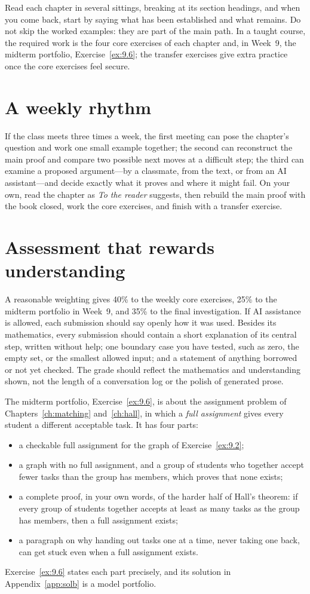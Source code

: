 Read each chapter in several sittings, breaking at its section headings, and when you come back, start by saying what has been established and what remains. Do not skip the worked examples: they are part of the main path. In a taught course, the required work is the four core exercises of each chapter and, in Week~9, the midterm portfolio, Exercise~\ref{ex:9.6}; the transfer exercises give extra practice once the core exercises feel secure.

\section*{A weekly rhythm}
If the class meets three times a week, the first meeting can pose the chapter's question and work one small example together; the second can reconstruct the main proof and compare two possible next moves at a difficult step; the third can examine a proposed argument---by a classmate, from the text, or from an AI assistant---and decide exactly what it proves and where it might fail. On your own, read the chapter as \emph{To the reader} suggests, then rebuild the main proof with the book closed, work the core exercises, and finish with a transfer exercise.

\section*{Assessment that rewards understanding}
A reasonable weighting gives 40\% to the weekly core exercises, 25\% to the midterm portfolio in Week~9, and 35\% to the final investigation. If AI assistance is allowed, each submission should say openly how it was used. Besides its mathematics, every submission should contain a short explanation of its central step, written without help; one boundary case you have tested, such as zero, the empty set, or the smallest allowed input; and a statement of anything borrowed or not yet checked. The grade should reflect the mathematics and understanding shown, not the length of a conversation log or the polish of generated prose.

The midterm portfolio, Exercise~\ref{ex:9.6}, is about the assignment problem of Chapters~\ref{ch:matching} and~\ref{ch:hall}, in which a \emph{full assignment} gives every student a different acceptable task. It has four parts:
\begin{itemize}
\item a checkable full assignment for the graph of Exercise~\ref{ex:9.2};
\item a graph with no full assignment, and a group of students who together accept fewer tasks than the group has members, which proves that none exists;
\item a complete proof, in your own words, of the harder half of Hall's theorem: if every group of students together accepts at least as many tasks as the group has members, then a full assignment exists;
\item a paragraph on why handing out tasks one at a time, never taking one back, can get stuck even when a full assignment exists.
\end{itemize}
Exercise~\ref{ex:9.6} states each part precisely, and its solution in Appendix~\ref{app:solb} is a model portfolio.


